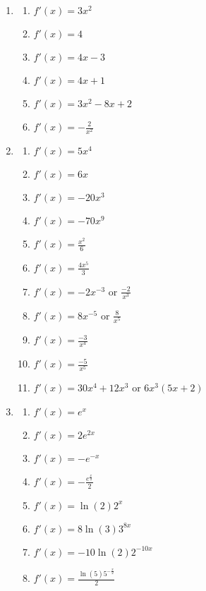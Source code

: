 \documentclass[a4paper,12pt]{article}
\begin{document}
\begin{enumerate}
\item
    \begin{multicols}{2}
    \begin{enumerate}
    \item \sspacer$f'(x) = 3x^2$
    \item \sspacer$f'(x) = 4$
    \item \sspacer$f'(x) = 4x - 3$
    \item \sspacer$f'(x) = 4x + 1$
    \item \sspacer$f'(x) = 3x^2 - 8x + 2$
    \item \sspacer$f'(x) = -\frac{2}{x^2}$
    \end{enumerate}
    \end{multicols}

\item
    \begin{multicols}{2}
    \begin{enumerate}
    \item \spacer$f'(x) = 5x^4$
    \item \spacer$f'(x) = 6x$
    \item \spacer$f'(x) = -20x^3$
    \item \spacer$f'(x) = -70x^9$
    \item \spacer$f'(x) = \frac{x^2}{6}$
    \item \spacer$f'(x) = \frac{4x^5}{3}$
    \item \spacer$f'(x) = -2x^{-3}$ or $\frac{-2}{x^3}$
    \item \spacer$f'(x) = 8x^{-5}$ or $\frac{8}{x^5}$
    \item \spacer$f'(x) = \frac{-3}{x^4}$
    \item \spacer$f'(x) = \frac{-5}{x^5}$
    \item \spacer$f'(x) = 30x^4 + 12x^3$ or $6x^3(5x + 2)$
    \end{enumerate}
    \end{multicols}

\item
    \begin{multicols}{2}
    \begin{enumerate}
    \item \spacer$f'(x) = e^x$
    \item \spacer$f'(x) = 2e^{2x}$
    \item \spacer$f'(x) = -e^{-x}$
    \item \spacer$f'(x) = -\frac{e^{\frac{x}{2}}}{2}$
    \item \spacer$f'(x) = \ln(2)2^x$
    \item \spacer$f'(x) = 8\ln(3)3^{8x}$
    \item \spacer$f'(x) = -10\ln(2)2^{-10x}$
    \item \spacer$f'(x) = \frac{\ln(5)5^{-\frac{x}{2}}}{2}$
    \end{enumerate}
    \end{multicols}


\end{enumerate}
\end{document}
